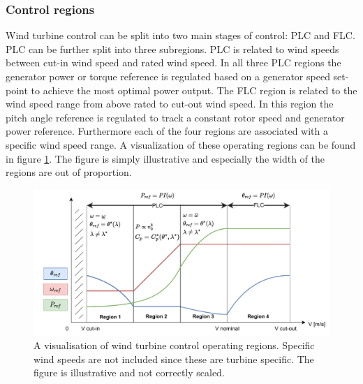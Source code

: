 \subsubsection{Control regions} \label{sec:theory_ctrl_regions}
Wind turbine control can be split into two main stages of control: PLC and FLC. PLC can be further split into three subregions. PLC is related to wind speeds between cut-in wind speed and rated wind speed. In all three PLC regions the generator power or torque reference is regulated based on a generator speed set-point to achieve the most optimal power output. The FLC region is related to the wind speed range from above rated to cut-out wind speed. In this region the pitch angle reference is regulated to track a constant rotor speed and generator power reference. Furthermore each of the four regions are associated with a specific wind speed range. A visualization of these operating regions can be found in figure \cref{fig:operating_regions}. The figure is simply illustrative and especially the width of the regions are out of proportion. 
\begin{figure}[ht]
	\centering
	\includegraphics[width=0.9\linewidth]{Graphics/OperatingRegions.pdf}
	\caption{A visualisation of wind turbine control operating regions. Specific wind speeds are not included since these are turbine specific. The figure is illustrative and not correctly scaled.}
	\label{fig:operating_regions}
\end{figure}

